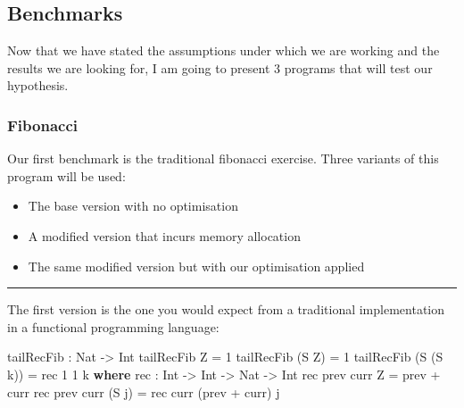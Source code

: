 \documentclass[
]{article}
\newenvironment{Shaded}{}{}
\newcommand{\DataTypeTok}[1]{\textcolor[rgb]{0.56,0.13,0.00}{#1}}
\newcommand{\DecValTok}[1]{\textcolor[rgb]{0.25,0.63,0.44}{#1}}
\newcommand{\KeywordTok}[1]{\textcolor[rgb]{0.00,0.44,0.13}{\textbf{#1}}}
\newcommand{\NormalTok}[1]{#1}
\newcommand{\OperatorTok}[1]{\textcolor[rgb]{0.40,0.40,0.40}{#1}}
\newcommand{\OtherTok}[1]{\textcolor[rgb]{0.00,0.44,0.13}{#1}}
\providecommand{\tightlist}{%
  \setlength{\itemsep}{0pt}\setlength{\parskip}{0pt}}
\begin{document}
\hypertarget{benchmarks}{%
\subsection{Benchmarks}\label{benchmarks}}

Now that we have stated the assumptions under which we are working and
the results we are looking for, I am going to present 3 programs that
will test our hypothesis.

\hypertarget{fibonacci}{%
\subsubsection{Fibonacci}\label{fibonacci}}

Our first benchmark is the traditional fibonacci exercise. Three
variants of this program will be used:

\begin{itemize}
\tightlist
\item
  The base version with no optimisation
\item
  A modified version that incurs memory allocation
\item
  The same modified version but with our optimisation applied
\end{itemize}

\begin{center}\rule{0.5\linewidth}{0.5pt}\end{center}

The first version is the one you would expect from a traditional
implementation in a functional programming language:

\begin{Shaded}
\begin{Highlighting}[]
\NormalTok{tailRecFib }\OperatorTok{:} \DataTypeTok{Nat} \OtherTok{{-}\textgreater{}} \DataTypeTok{Int}
\NormalTok{tailRecFib }\DataTypeTok{Z} \OtherTok{=} \DecValTok{1}
\NormalTok{tailRecFib (}\DataTypeTok{S} \DataTypeTok{Z}\NormalTok{) }\OtherTok{=} \DecValTok{1}
\NormalTok{tailRecFib (}\DataTypeTok{S}\NormalTok{ (}\DataTypeTok{S}\NormalTok{ k)) }\OtherTok{=}\NormalTok{ rec }\DecValTok{1} \DecValTok{1}\NormalTok{ k}
  \KeywordTok{where}
\NormalTok{    rec }\OperatorTok{:} \DataTypeTok{Int} \OtherTok{{-}\textgreater{}} \DataTypeTok{Int} \OtherTok{{-}\textgreater{}} \DataTypeTok{Nat} \OtherTok{{-}\textgreater{}} \DataTypeTok{Int}
\NormalTok{    rec prev curr }\DataTypeTok{Z} \OtherTok{=}\NormalTok{ prev }\OperatorTok{+}\NormalTok{ curr}
\NormalTok{    rec prev curr (}\DataTypeTok{S}\NormalTok{ j) }\OtherTok{=}\NormalTok{ rec curr (prev }\OperatorTok{+}\NormalTok{ curr) j}
\end{Highlighting}
\end{Shaded}
\end{document}
